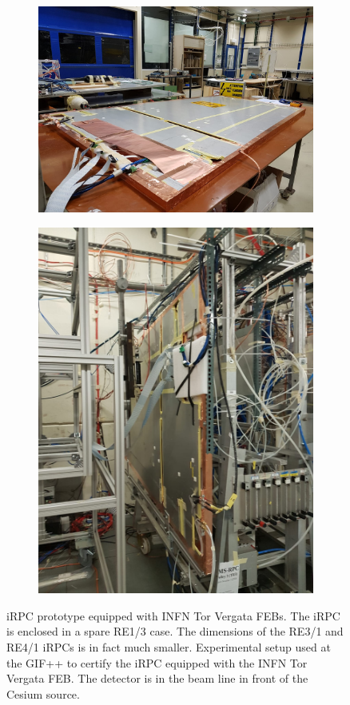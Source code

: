 	\begin{figure}[H]
		\begin{subfigure}{.5\linewidth}
			\centering
			\includegraphics[width = 0.8\linewidth]{fig/chapt6/INFN-FEB-iRPC.png}
			\caption{\label{fig:INFN-iRPC:A}}
		\end{subfigure}
		\begin{subfigure}{.5\linewidth}
			\centering
			\includegraphics[width = 0.8\linewidth]{fig/chapt6/INFN-FEB-iRPC-GIFpp.png}
			\caption{\label{fig:INFN-iRPC:B}}
		\end{subfigure}
		\caption{\label{fig:INFN-iRPC}  iRPC prototype equipped with INFN Tor Vergata FEBs. The iRPC is enclosed in a spare RE1/3 case. The dimensions of the RE3/1 and RE4/1 iRPCs is in fact much smaller.  Experimental setup used at the GIF++ to certify the iRPC equipped with the INFN Tor Vergata FEB. The detector is in the beam line in front of the Cesium source.}
    \end{figure}
	 
